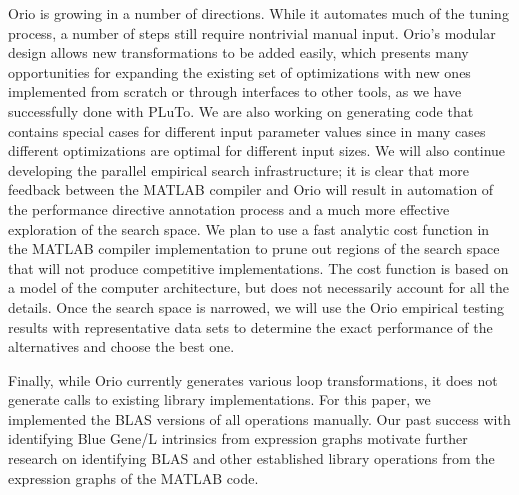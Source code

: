 \documentclass[runningheads]{llncs}
\begin{document}
Orio is growing in a number of directions. While it automates much of the tuning process, a number of steps still require nontrivial manual input. Orio's modular design allows new transformations to be added easily, which presents many opportunities for expanding the existing set of optimizations with new ones implemented from scratch or through interfaces to other tools, as we have successfully done with PLuTo. We are also working on generating code that contains special cases for different input parameter values since in many cases different optimizations are optimal for different input sizes.  We will also continue developing the parallel empirical search infrastructure; it is clear that more feedback between the MATLAB compiler and Orio will result in automation of the performance directive annotation process and a much more effective exploration of the search space. We plan to use a fast analytic cost function in the MATLAB compiler implementation to prune out regions of the search space that will not produce competitive implementations. The cost function is based on a model of the computer architecture, but does not necessarily account for all the details. Once the search space is narrowed, we will use the Orio empirical testing results with representative data sets to determine the exact performance of the alternatives and choose the best one.

Finally, while Orio currently generates various loop transformations, it does not generate calls to existing library implementations. For this paper, we implemented the BLAS versions of all operations manually. Our past success with identifying Blue Gene/L intrinsics from expression graphs motivate further research on identifying BLAS and other established library operations from the expression graphs of the MATLAB code.





\end{document}
